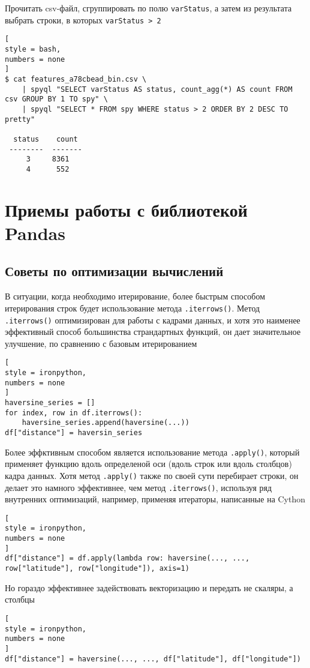 \documentclass[%
	11pt,
	a4paper,
	utf8,
		]{article}
\begin{document}
Прочитать csv-файл, сгруппировать по полю \texttt{varStatus}, а затем из результата выбрать строки, в которых \texttt{varStatus > 2}
\begin{lstlisting}[
style = bash,
numbers = none
]
$ cat features_a78cbead_bin.csv \
    | spyql "SELECT varStatus AS status, count_agg(*) AS count FROM csv GROUP BY 1 TO spy" \
    | spyql "SELECT * FROM spy WHERE status > 2 ORDER BY 2 DESC TO pretty"
  
  status    count
 --------  -------
     3     8361
     4      552
\end{lstlisting}


\section{Приемы работы с библиотекой Pandas}

\subsection{Советы по оптимизации вычислений}

В ситуации, когда необходимо итерирование, более быстрым способом итерирования строк будет использование метода \texttt{.iterrows()}. Метод \texttt{.iterrows()} оптимизирован для работы с кадрами данных, и хотя это наименее эффективный способ большинства страндартных функций, он дает значительное улучшение, по сравнению с базовым итерированием \cite[]{heydt:pandas-2019}
\begin{lstlisting}[
style = ironpython,
numbers = none
]
haversine_series = []
for index, row in df.iterrows():
    haversine_series.append(haversine(...))
df["distance"] = haversin_series
\end{lstlisting}

Более эффктивным способом является использование метода \texttt{.apply()}, который применяет функцию вдоль определеной оси (вдоль строк или вдоль столбцов) кадра данных. Хотя метод \texttt{.apply()} также по своей сути перебирает строки, он делает это намного эффективнее, чем метод \texttt{.iterrows()}, используя ряд внутренних оптимизаций, например, применяя итераторы, написанные на Cython \cite[]{heydt:pandas-2019}
\begin{lstlisting}[
style = ironpython,
numbers = none
]
df["distance"] = df.apply(lambda row: haversine(..., ..., row["latitude"], row["longitude"]), axis=1)
\end{lstlisting}

Но гораздо эффективнее задействовать векторизацию и передать не скаляры, а столбцы
\begin{lstlisting}[
style = ironpython,
numbers = none
]
df["distance"] = haversine(..., ..., df["latitude"], df["longitude"])
\end{lstlisting}
\end{document}

